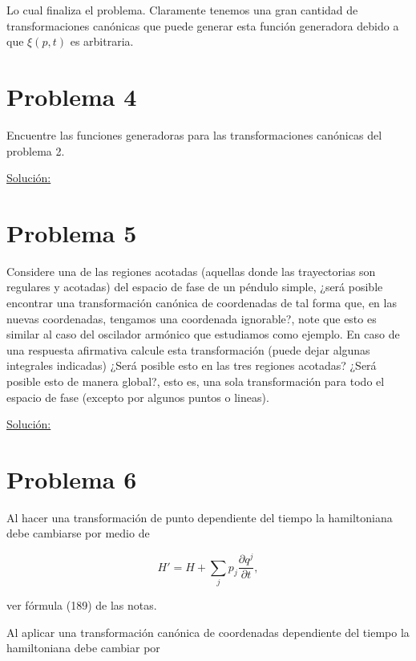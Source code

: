 \documentclass[a4paper,10pt]{article}
\numberwithin{equation}{section}
\begin{document}
Lo cual finaliza el problema. Claramente tenemos una gran cantidad de transformaciones 
canónicas que puede generar esta función generadora debido a que $\xi(p,t)$ es arbitraria.

\section{Problema 4}

Encuentre las funciones generadoras para las transformaciones canónicas del problema 
2.

\vspace{.3cm}

\underline{Solución:} \vspace{.3cm}

\section{Problema 5}

Considere una de las regiones acotadas (aquellas donde las trayectorias son regulares 
y acotadas) del espacio de fase de un péndulo simple, ¿será posible encontrar una 
transformación canónica de coordenadas de tal forma que, en las nuevas coordenadas, 
tengamos una coordenada ignorable?, note que esto es similar al caso del oscilador 
armónico que estudiamos como ejemplo. En caso de una respuesta afirmativa calcule 
esta transformación (puede dejar algunas integrales indicadas) ¿Será posible 
esto en las tres regiones acotadas? ¿Será posible esto de manera global?, esto es,
una sola transformación para todo el espacio de fase (excepto por algunos puntos o 
lineas).

\vspace{.3cm}

\underline{Solución:} \vspace{.3cm}

\section{Problema 6}

Al hacer una transformación de punto dependiente del tiempo la hamiltoniana 
debe cambiarse por medio de 

$$
H' = H + \sum_j p_j \frac{\partial q^j}{\partial t},
$$

ver fórmula (189) de las notas.

\vspace{.3cm}

Al aplicar una transformación canónica de coordenadas dependiente del tiempo la 
hamiltoniana debe cambiar por 
\end{document}
